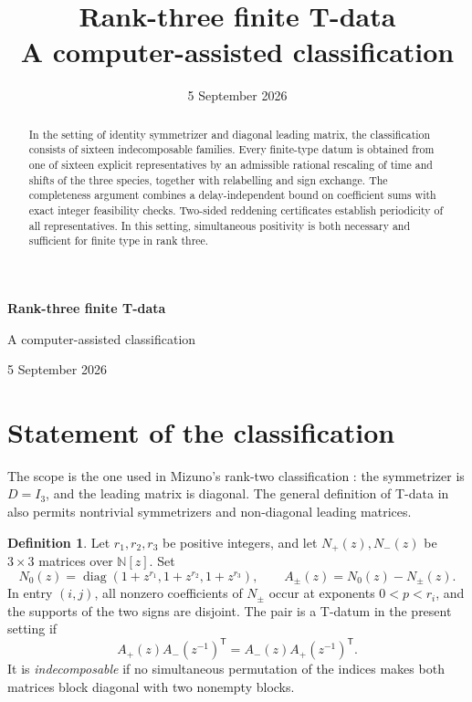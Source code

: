 \documentclass[11pt,a4paper]{article}
\title{\vspace{-12mm}\textbf{Rank-three finite T-data}\\[4pt]
  \large A computer-assisted classification}
\author{}
\date{5 September 2026}
\theoremstyle{definition}
\newtheorem{definition}[theorem]{Definition}
\DeclareMathOperator{\diag}{diag}
\newcommand{\N}{\mathbb N}
\begin{document}
\thispagestyle{plain}
\begin{center}
{\LARGE\bfseries Rank-three finite T-data\par}
\vspace{4pt}
{\large A computer-assisted classification\par}
\vspace{9pt}
{\small 5 September 2026}
\end{center}
\begin{abstract}
In the setting of identity symmetrizer and diagonal leading matrix, the
classification consists of sixteen indecomposable families. Every finite-type
datum is obtained from one of sixteen explicit representatives by an admissible
rational rescaling of time and shifts of the three species, together with
relabelling and sign exchange. The completeness argument combines a
delay-independent bound on coefficient sums with exact integer feasibility
checks. Two-sided reddening certificates establish periodicity of all
representatives. In this setting, simultaneous positivity is both necessary
and sufficient for finite type in rank three.
\end{abstract}

\section{Statement of the classification}\label{sec:statement}

The scope is the one used in Mizuno's rank-two classification
\cite{MizunoRankTwo}: the symmetrizer is $D=I_3$, and the leading matrix is
diagonal. The general definition of T-data in \cite{MizunoTData} also permits
nontrivial symmetrizers and non-diagonal leading matrices.

\begin{definition}\label{def:datum}
Let $r_1,r_2,r_3$ be positive integers, and let $N_+(z),N_-(z)$ be
$3\times3$ matrices over $\N[z]$. Set
\begin{equation}\label{eq:leading}
 N_0(z)=\diag(1+z^{r_1},1+z^{r_2},1+z^{r_3}),\qquad
 A_\pm(z)=N_0(z)-N_\pm(z).
\end{equation}
In entry $(i,j)$, all nonzero coefficients of $N_\pm$ occur at exponents
$0<p<r_i$, and the supports of the two signs are disjoint. The pair is a
T-datum in the present setting if
\begin{equation}\label{eq:symplectic}
 A_+(z)A_-(z^{-1})^{\mathsf T}
 =A_-(z)A_+(z^{-1})^{\mathsf T}.
\end{equation}
It is \emph{indecomposable} if no simultaneous permutation of the indices
makes both matrices block diagonal with two nonempty blocks.
\end{definition}
\end{document}
